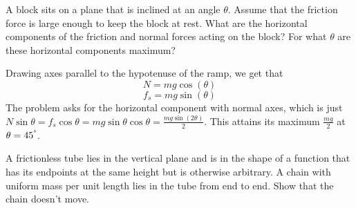 \documentclass[11pt]{scrartcl}
\begin{document}
\begin{example}
  A block sits on a plane that is inclined at an angle $\theta$.
  Assume that the friction force is large enough to keep the block at rest.
  What are the horizontal components of the friction and normal forces
  acting on the block? For what $\theta$ are these horizontal components
  maximum?
\end{example}
\begin{soln}
  Drawing axes parallel to the hypotenuse of the ramp, we get that
  $$N=mg\cos(\theta)$$
  $$f_s=mg\sin(\theta)$$
  The problem asks for the horizontal component with normal axes, which is
  just $N\sin\theta=f_s\cos\theta=mg\sin\theta\cos\theta=\frac{mg\sin(2\theta)}{2}$.
  This attains its maximum $\frac{mg}{2}$ at $\theta=45^{\degree}$.
\end{soln}
\newpage
\begin{example}
  A frictionless tube lies in the vertical plane and is in the shape
  of a function that has its endpoints at the same height but is otherwise
  arbitrary. A chain with uniform mass per unit length lies in the tube from
  end to end. Show that the chain doesn't move.
\end{example}
\end{document}
